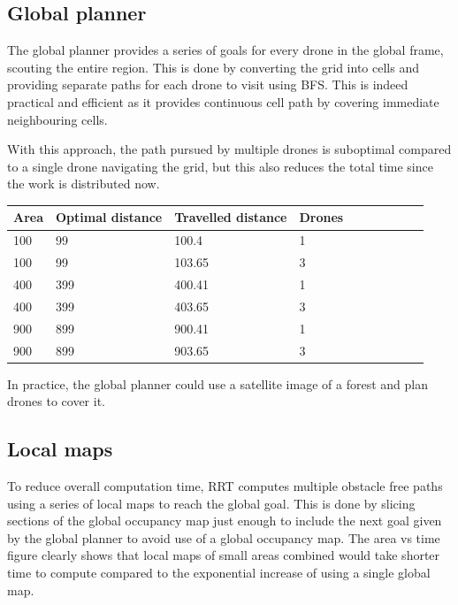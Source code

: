  
\subsection{Global planner}

The global planner provides a series of goals for every drone in the global frame, scouting the entire region. This is done by converting the grid into cells and providing separate paths for each drone to visit using BFS. This is indeed practical and efficient as it provides continuous cell path by covering immediate neighbouring cells.

With this approach, the path pursued by multiple drones is suboptimal compared to a single drone navigating the grid, but this also reduces the total time since the work is distributed now.


\begin{table}[!ht]
    \centering
    \begin{tabular}{|l|l|l|l|l|l|l|l|l|l|}
    \hline
        Area & Optimal distance & Travelled distance & Drones \\ \hline
        100 & 99 & 100.4 & 1 \\ \hline
        100 & 99 & 103.65 & 3 \\ \hline
        400 & 399 & 400.41 & 1 \\ \hline
        400 & 399 & 403.65 & 3 \\ \hline
        900 & 899 & 900.41 & 1 \\ \hline
        900 & 899 & 903.65 & 3 \\ \hline
    \end{tabular}
\end{table}

In practice, the global planner could use a satellite image of a forest and plan drones to cover it. 


\subsection{Local maps}

To reduce overall computation time, RRT computes multiple obstacle free paths
using a series of local maps to reach the global goal. This is done by slicing sections of the global occupancy map just enough to include the next goal given by the global planner to avoid use of a global occupancy map. The area vs time figure clearly shows that local maps of small areas combined would take shorter time to compute compared to the exponential increase of using a single global map.

